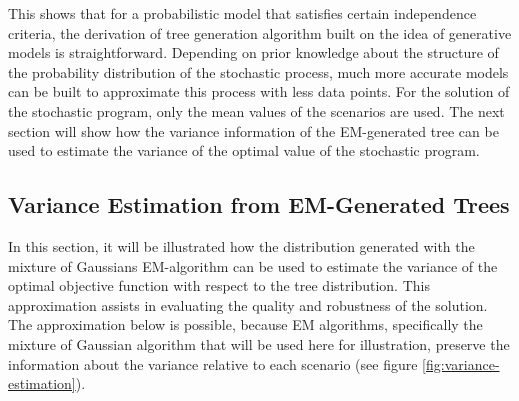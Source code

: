 This shows that for a probabilistic model that satisfies certain independence criteria, the derivation of tree generation algorithm built on the idea of generative models is straightforward.
Depending on prior knowledge about the structure of the probability distribution of the stochastic process, much more accurate models can be built to approximate this process with less data points.
For the solution of the stochastic program, only the mean values of the scenarios are used.
The next section will show how the variance information of the EM-generated tree can be used to estimate the variance of the optimal value of the stochastic program.
\subsection{Variance Estimation from EM-Generated Trees}
\label{sec:variance-estimation}
In this section, it will be illustrated how the distribution generated with the mixture of Gaussians EM-algorithm can be used to estimate the variance of the optimal objective function with respect to the tree distribution.
This approximation assists in evaluating the quality and robustness of the solution.
The approximation below is possible, because EM algorithms, specifically the mixture of Gaussian algorithm that will be used here for illustration, preserve the information about the variance relative to each scenario (see figure \ref{fig:variance-estimation}).

